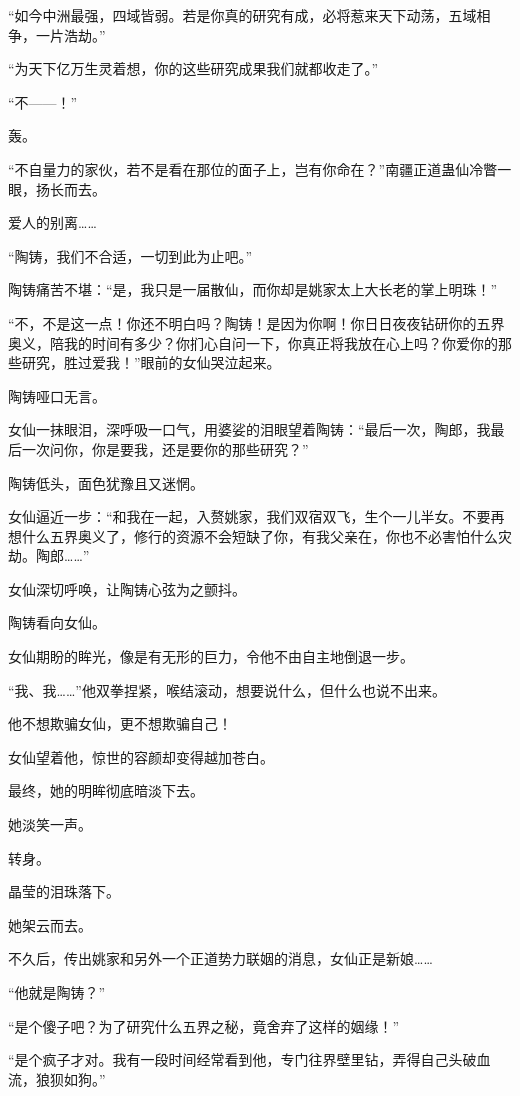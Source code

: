 \begin{this_body}
“如今中洲最强，四域皆弱。若是你真的研究有成，必将惹来天下动荡，五域相争，一片浩劫。”

“为天下亿万生灵着想，你的这些研究成果我们就都收走了。”

“不——！”

轰。

“不自量力的家伙，若不是看在那位的面子上，岂有你命在？”南疆正道蛊仙冷瞥一眼，扬长而去。

爱人的别离……

“陶铸，我们不合适，一切到此为止吧。”

陶铸痛苦不堪：“是，我只是一届散仙，而你却是姚家太上大长老的掌上明珠！”

“不，不是这一点！你还不明白吗？陶铸！是因为你啊！你日日夜夜钻研你的五界奥义，陪我的时间有多少？你扪心自问一下，你真正将我放在心上吗？你爱你的那些研究，胜过爱我！”眼前的女仙哭泣起来。

陶铸哑口无言。

女仙一抹眼泪，深呼吸一口气，用婆娑的泪眼望着陶铸：“最后一次，陶郎，我最后一次问你，你是要我，还是要你的那些研究？”

陶铸低头，面色犹豫且又迷惘。

女仙逼近一步：“和我在一起，入赘姚家，我们双宿双飞，生个一儿半女。不要再想什么五界奥义了，修行的资源不会短缺了你，有我父亲在，你也不必害怕什么灾劫。陶郎……”

女仙深切呼唤，让陶铸心弦为之颤抖。

陶铸看向女仙。

女仙期盼的眸光，像是有无形的巨力，令他不由自主地倒退一步。

“我、我……”他双拳捏紧，喉结滚动，想要说什么，但什么也说不出来。

他不想欺骗女仙，更不想欺骗自己！

女仙望着他，惊世的容颜却变得越加苍白。

最终，她的明眸彻底暗淡下去。

她淡笑一声。

转身。

晶莹的泪珠落下。

她架云而去。

不久后，传出姚家和另外一个正道势力联姻的消息，女仙正是新娘……

“他就是陶铸？”

“是个傻子吧？为了研究什么五界之秘，竟舍弃了这样的姻缘！”

“是个疯子才对。我有一段时间经常看到他，专门往界壁里钻，弄得自己头破血流，狼狈如狗。”


\end{this_body}

